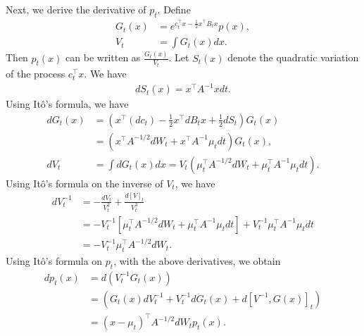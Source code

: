 \documentclass[11pt,twoside]{article}
\newcommand{\co}{A}
\theoremstyle{named}
\theoremstyle{plain}
\newcommand{\brackets}[1]{\left[ #1 \right]}
\newcommand{\parenth}[1]{\left( #1 \right)}
\newcommand{\tp}{^\top}
\begin{document}
Next, we derive the derivative of $p_t$. Define
\begin{align*}
  G_t(x) &= e^{c_t\tp x - \frac{1}{2} x\tp B_t x} p(x), \\
  V_t & = \int G_t(x) dx.
\end{align*}
Then $p_t(x)$ can be written as $\frac{G_t(x)}{V_t}$. Let $S_t(x)$ denote the quadratic variation of the process $c_t\tp x$. We have
\begin{align*}
  d S_t(x) = x\tp \co^{-1} x dt.
\end{align*}
Using It\^o's formula, we have
\begin{align*}
  dG_t(x) &= \parenth{x\tp (dc_t) - \frac{1}{2} x\tp dB_t x + \frac{1}{2} dS_t} G_t(x) \\
  &= \parenth{x\tp \co^{-1/2}dW_t + x\tp \co^{-1} \mu_t dt} G_t(x), \\
  dV_t &= \int dG_t(x) dx = V_t \parenth{\mu_t\tp \co^{-1/2}dW_t + \mu_t\tp \co^{-1} \mu_t dt}.
\end{align*}
Using It\^o's formula on the inverse of $V_t$, we have
\begin{align*}
  d V_t^{-1} &= -\frac{dV_t}{V_t^2} + \frac{d \brackets{V}_t} {V_t^3} \\
  &= - V_t^{-1} \brackets{\mu_t\tp \co^{-1/2} dW_t + \mu_t\tp \co^{-1} \mu_t dt} + V_t^{-1} \mu_t\tp \co^{-1} \mu_t dt \\
  &= - V_t^{-1} \mu_t\tp \co^{-1/2} dW_t.
\end{align*}
Using It\^o's formula on $p_t$, with the above derivatives, we obtain
\begin{align*}
  dp_t(x) &= d \parenth{V_t^{-1} G_t(x)} \\
          &= \parenth{G_t(x) dV_t^{-1} + V_t^{-1}dG_t(x) + d\brackets{V^{-1}, G(x)}_t} \\
          &= \parenth{x-\mu_t}\tp \co^{-1/2} dW_t p_t(x).
\end{align*}
\end{document}
